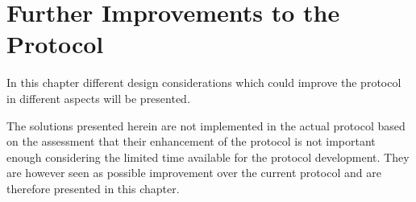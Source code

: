 \chapter{Further Improvements to the Protocol}\label{mortenStuff}
In this chapter different design considerations which could improve the protocol in different aspects will be presented.

The solutions presented herein are not implemented in the actual protocol based on the assessment that their enhancement of the protocol is not important enough considering the limited time available for the protocol development. 
They are however seen as possible improvement over the current protocol and are therefore presented in this chapter. 




